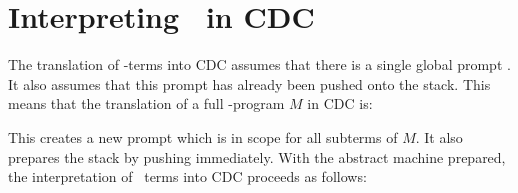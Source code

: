 
\section{Interpreting \lmu\ in CDC}



The translation of \lmu-terms into CDC assumes that there is a single global prompt \gp. 
It also assumes that this prompt has already been pushed onto the stack.
This means that the translation of a full \lmu-program $M$ in CDC is:

This creates a new prompt \gp which is in scope for all subterms of $M$.
It also prepares the stack by pushing \gp immediately. 
With the abstract machine prepared, 
the interpretation of \lmu\ terms into CDC proceeds as follows:


